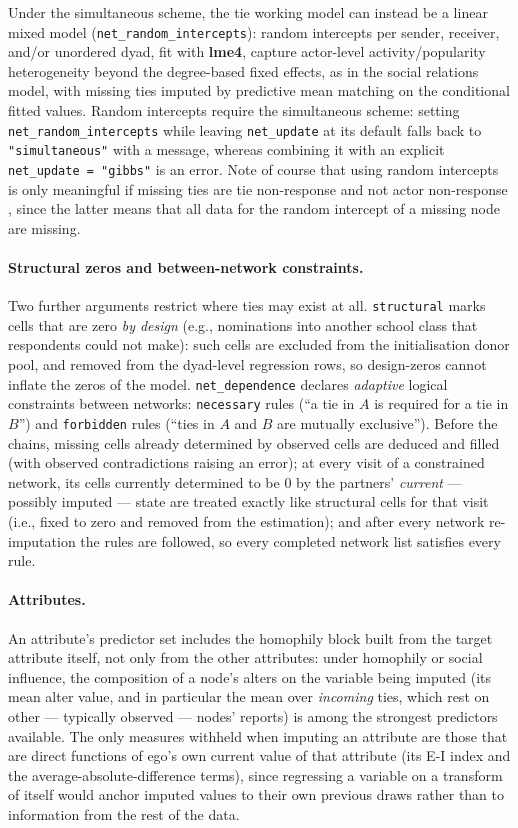 \documentclass[11pt,a4paper]{article}
\newcommand{\pkg}[1]{\textbf{#1}}
\newcommand{\code}[1]{\texttt{#1}}
\begin{document}
Under the simultaneous scheme, the tie working model can instead be a
linear mixed model (\code{net\_random\_intercepts}): random intercepts per
sender, receiver, and/or unordered dyad, fit with \pkg{lme4}, capture
actor-level activity/popularity heterogeneity beyond the degree-based fixed
effects, as in the social relations model, with missing ties imputed by
predictive mean matching on the conditional fitted values. Random
intercepts require the simultaneous scheme: setting
\code{net\_random\_intercepts} while leaving \code{net\_update} at its
default falls back to \code{"simultaneous"} with a message, whereas
combining it with an explicit \code{net\_update = "gibbs"} is an error. Note of course that using random intercepts is only meaningful if missing ties are tie non-response and not actor non-response \citep{huisman2008}, since the latter means that all data for the random intercept of a missing node are missing.

\paragraph{Structural zeros and between-network constraints.} Two further
arguments restrict where ties may exist at all. \code{structural} marks
cells that are zero \emph{by design} (e.g., nominations into another school
class that respondents could not make): such cells are excluded from the initialisation donor pool,
and removed from the dyad-level regression rows, so design-zeros cannot
inflate the zeros of the model. \code{net\_dependence} declares
\emph{adaptive} logical constraints between networks: \code{necessary}
rules (``a tie in $A$ is required for a tie in $B$'') and \code{forbidden}
rules (``ties in $A$ and $B$ are mutually exclusive''). Before the chains,
missing cells already determined by observed cells are deduced and filled
(with observed contradictions raising an error); at every visit of a
constrained network, its cells currently determined to be $0$ by the
partners' \emph{current} --- possibly imputed --- state are treated exactly
like structural cells for that visit (i.e., fixed to zero and removed from the estimation); and after every network
re-imputation the rules are followed, so every completed
network list satisfies every rule.

\paragraph{Attributes.} An attribute's predictor set includes the homophily block built from the
target attribute itself, not only from the other attributes: under
homophily or social influence, the composition of a node's alters on the
 variable being imputed (its mean alter value, and in particular the
mean over \emph{incoming} ties, which rest on other --- typically observed
--- nodes' reports) is among the strongest predictors available. The only
measures withheld when imputing an attribute are those that are direct
functions of ego's own current value of that attribute (its E-I index and
the average-absolute-difference terms), since regressing a variable on
a transform of itself would anchor imputed values to their own previous
draws rather than to information from the rest of the data.
\end{document}
